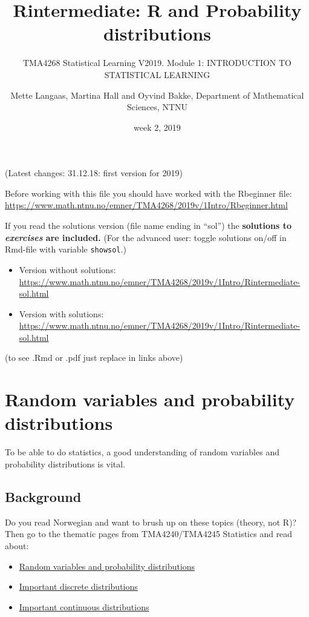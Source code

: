 \documentclass[]{article}
\title{Rintermediate: R and Probability distributions}
\subtitle{TMA4268 Statistical Learning V2019. Module 1: INTRODUCTION TO
STATISTICAL LEARNING}
\author{Mette Langaas, Martina Hall and Oyvind Bakke, Department of Mathematical
Sciences, NTNU}
\date{week 2, 2019}
\providecommand{\tightlist}{%
  \setlength{\itemsep}{0pt}\setlength{\parskip}{0pt}}
\begin{document}
\maketitle

{
\setcounter{tocdepth}{2}
\tableofcontents
}

(Latest changes: 31.12.18: first version for 2019)

Before working with this file you should have worked with the Rbeginner
file:
\url{https://www.math.ntnu.no/emner/TMA4268/2019v/1Intro/Rbeginner.html}

If you read the solutions version (file name ending in ``sol'') the
\textbf{solutions to \emph{exercises} are included.} (For the advanced
user: toggle solutions on/off in Rmd-file with variable
\texttt{showsol}.)

\begin{itemize}
\tightlist
\item
  Version without solutions:
  \url{https://www.math.ntnu.no/emner/TMA4268/2019v/1Intro/Rintermediate-sol.html}
\item
  Version with solutions:
  \url{https://www.math.ntnu.no/emner/TMA4268/2019v/1Intro/Rintermediate-sol.html}
\end{itemize}

(to see .Rmd or .pdf just replace in links above)

\section{Random variables and probability
distributions}\label{random-variables-and-probability-distributions}

To be able to do statistics, a good understanding of random variables
and probability distributions is vital.

\subsection{Background}\label{background}

Do you read Norwegian and want to brush up on these topics (theory, not
R)? Then go to the thematic pages from TMA4240/TMA4245 Statistics and
read about:

\begin{itemize}
\tightlist
\item
  \href{https://wiki.math.ntnu.no/tma4245/tema/begreper/variable}{Random
  variables and probability distributions}
\item
  \href{https://wiki.math.ntnu.no/tma4245/tema/begreper/discrete}{Important
  discrete distributions}
\item
  \href{https://wiki.math.ntnu.no/tma4245/tema/begreper/continuous}{Important
  continuous distributions}
\end{itemize}
\end{document}
